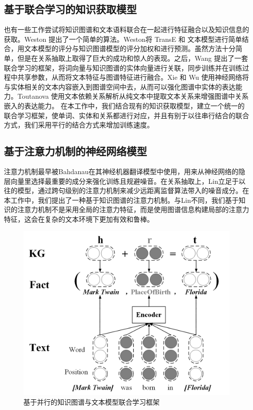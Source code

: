 \subsection{基于联合学习的知识获取模型}

也有一些工作尝试将知识图谱和文本语料联合在一起进行特征融合以及知识信息的获取。Weston \cite{weston2013connecting}提出了一个简单的算法。Weston将 TransE 和 文本模型进行简单结合，用文本模型的评分与知识图谱模型的评分加权和进行预测。虽然方法十分简单，但是在关系抽取上取得了巨大的成功和惊人的表现。之后，Wang \cite{wang2014knowledge} 提出了一套联合学习的框架，将词向量与知识图谱的实体向量进行关联，同步训练并在训练过程中共享参数，从而将文本特征与图谱特征进行融合。Xie \cite{xie2016representation}和 Wu \cite{wu2016knowledge} 使用神经网络将与实体相关的文本内容嵌入到图谱空间中去，从而可以强化图谱中实体的表达能力。Toutanova \cite{toutanova2015representing}使用文本依赖关系解析从纯文本中提取文本关系来增强图谱中关系嵌入的表达能力。 
在本工作中，我们结合现有的知识获取模型，建立一个统一的联合学习框架，使单词、实体和关系都进行对应，并且有别于以往串行结合的联合方式，我们采用平行的结合方式来增加训练速度。


\subsection{基于注意力机制的神经网络模型} 

注意力机制最早被Bahdanau\cite{bahdanau2014neural}在其神经机器翻译模型中使用，用来从神经网络的隐层向量里选择最重要的成分来强化训练且规避噪音。在关系抽取上，Lin\cite{lin2016neural}立足于以往的模型，通过跨句级别的注意力机制来减少远距离监督算法带入的噪音成分。在本工作中，我们提出了一种基于知识图谱的注意力机制。与Lin\cite{lin2016neural}不同，我们基于知识的注意力机制不是采用全局的注意力特征，而是使用图谱信息构建局部的注意力特征，这会在复杂的文本环境下更加有效和鲁棒。


\vspace{25pt}
\begin{figure}[h]
\setlength{\abovecaptionskip}{30pt} 
\centering
\includegraphics[width=0.8\columnwidth]{figures/ch3/joint.jpg}
\caption{基于并行的知识图谱与文本模型联合学习框架}
\label{fig3:joinglearning}
\end{figure}


